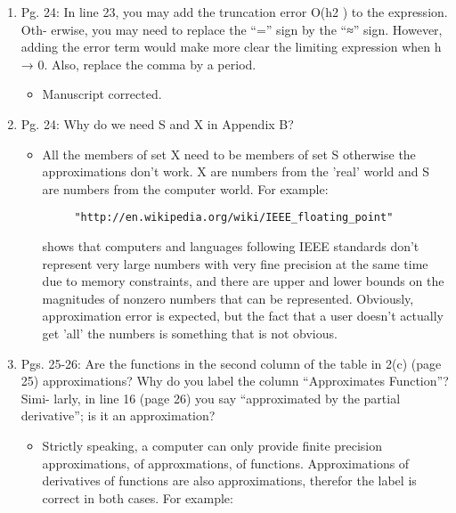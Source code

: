 \documentclass{article}
\begin{document}
\begin{enumerate}
 \item
    Pg. 24: In line 23, you may add the truncation error O(h2 ) to the expression. Oth-
    erwise, you may need to replace the “=” sign by the “≈” sign. However, adding
    the error term would make more clear the limiting expression when h → 0. Also,
    replace the comma by a period.

{\color{red}  
\begin{itemize}
     \item
         Manuscript corrected.
  \end{itemize}}

\item    
Pg. 24: Why do we need S and X in Appendix B?

{\color{red}  
\begin{itemize}
     \item

     All the members of set X need to be members of set S otherwise the
     approximations don't work. X are numbers from the 'real' world and S are
     numbers from the computer world. For example:

     \begin{verbatim}
     "http://en.wikipedia.org/wiki/IEEE_floating_point" 
     \end{verbatim}
     
     shows that computers
     and languages following IEEE standards don't represent very large numbers
     with very fine precision at the same time due to memory constraints, and
     there are upper and lower bounds on the magnitudes of nonzero numbers that
     can be represented. Obviously, approximation error is expected, but the
     fact that a user doesn't actually get 'all' the numbers is something that
     is not obvious.

  \end{itemize}}


\item
    Pgs. 25-26: Are the functions in the second column of the table in 2(c) (page 25)
    approximations? Why do you label the column “Approximates Function”? Simi-
    larly, in line 16 (page 26) you say “approximated by the partial derivative”; is it an
    approximation?

{\color{red}  
\begin{itemize}
     \item

      Strictly speaking, a computer can only provide finite precision
      approximations, of approxmations, of functions. Approximations of
      derivatives of functions are also approximations, therefor the label is
      correct in both cases. For example:


\end{itemize}}
\end{enumerate}
\end{document}
